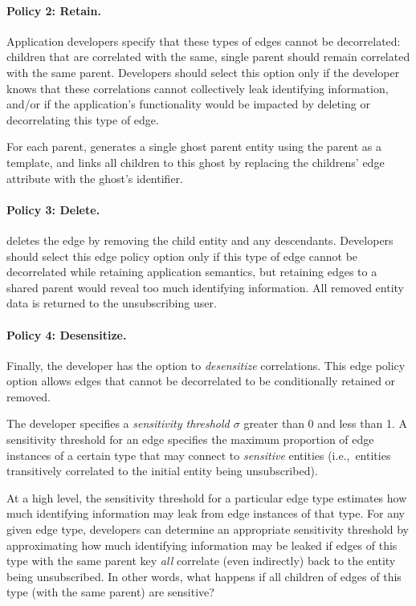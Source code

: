 \paragraph{Policy 2: Retain.}
Application developers specify that these types of edges cannot be decorrelated: children 
that are correlated with the same, single parent should remain correlated with the same 
parent. Developers should select this option only if the developer knows that these correlations
cannot collectively leak identifying information, and/or if the application's functionality would be
impacted by deleting or decorrelating this type of edge.

For each parent, \sys generates a single ghost parent entity using the parent as a template, and
links all children to this ghost by replacing the childrens' edge attribute with the ghost's
identifier.

\paragraph{Policy 3: Delete.}
\sys deletes the edge by removing the child entity and any descendants.  Developers should select
this edge policy option only if this type of edge cannot be decorrelated while retaining application
semantics, but retaining edges to a shared parent would reveal too much identifying information.
All removed entity data is returned to the unsubscribing user.

\paragraph{Policy 4: Desensitize.}
Finally, the developer has the option to \emph{desensitize} correlations. This edge policy option
allows edges that cannot be decorrelated to be conditionally retained or removed.

The developer specifies a \emph{sensitivity threshold $\sigma$} greater than 0 and less than 1.  A
sensitivity threshold for an edge specifies the maximum proportion of edge instances of a certain
type that may connect to \emph{sensitive} entities (i.e.,\ entities transitively correlated to the
initial entity being unsubscribed). 

At a high level, the sensitivity threshold for a particular edge type estimates how much identifying
information may leak from edge instances of that type.  For any given edge type, developers can
determine an appropriate sensitivity threshold by approximating how much identifying information may
be leaked if edges of this type with the same parent key \emph{all} correlate (even indirectly) back
to the entity being unsubscribed. In other words, what happens if all children of edges of this type
(with the same parent) are sensitive?

